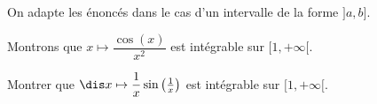 \documentclass[a4paper,10pt]{report}
\begin{document}
\begin{rem} On adapte les énoncés dans le cas d'un intervalle de la forme $]a,b]$.
\end{rem}

\begin{preuve}
%

\vspace{10cm}
\newpage

%
\end{preuve}

\begin{ex} Montrons que $x \mapsto \dfrac{\cos(x)}{x^2}$ est intégrable sur $[1,+ \infty[$.

\vspace{4cm}
\end{ex}

\begin{exa} Montrer que $\dis x \mapsto \dfrac{1}{x} \sin \left( \frac{1}{x} \right)$ est intégrable sur $[1,+ \infty[$.
\end{exa} 
\end{document}
